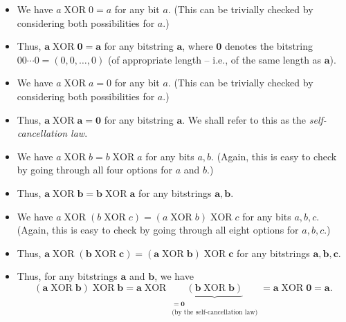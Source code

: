 \documentclass[numbers=enddot,12pt,final,onecolumn,notitlepage]{scrartcl}%
\numberwithin{exer}{subsection}
\theoremstyle{definition}
\begin{document}
\begin{itemize}
\item We have $a\operatorname*{XOR}0=a$ for any bit $a$. (This can be
trivially checked by considering both possibilities for $a$.)

\item Thus, $\mathbf{a}\operatorname*{XOR}\mathbf{0}=\mathbf{a}$ for any
bitstring $\mathbf{a}$, where $\mathbf{0}$ denotes the bitstring
$00\cdots0=\left(  0,0,\ldots,0\right)  $ (of appropriate length -- i.e., of
the same length as $\mathbf{a}$).

\item We have $a\operatorname*{XOR}a=0$ for any bit $a$. (This can be
trivially checked by considering both possibilities for $a$.)

\item Thus, $\mathbf{a}\operatorname*{XOR}\mathbf{a}=\mathbf{0}$ for any
bitstring $\mathbf{a}$. We shall refer to this as the
\textit{self-cancellation law}.

\item We have $a\operatorname*{XOR}b=b\operatorname*{XOR}a$ for any bits
$a,b$. (Again, this is easy to check by going through all four options for $a$
and $b$.)

\item Thus, $\mathbf{a}\operatorname*{XOR}\mathbf{b}=\mathbf{b}%
\operatorname*{XOR}\mathbf{a}$ for any bitstrings $\mathbf{a},\mathbf{b}$.

\item We have $a\operatorname*{XOR}\left(  b\operatorname*{XOR}c\right)
=\left(  a\operatorname*{XOR}b\right)  \operatorname*{XOR}c$ for any bits
$a,b,c$. (Again, this is easy to check by going through all eight options for
$a,b,c$.)

\item Thus, $\mathbf{a}\operatorname*{XOR}\left(  \mathbf{b}%
\operatorname*{XOR}\mathbf{c}\right)  =\left(  \mathbf{a}\operatorname*{XOR}%
\mathbf{b}\right)  \operatorname*{XOR}\mathbf{c}$ for any bitstrings
$\mathbf{a},\mathbf{b},\mathbf{c}$.

\item Thus, for any bitstrings $\mathbf{a}$ and $\mathbf{b}$, we have%
\[
\left(  \mathbf{a}\operatorname*{XOR}\mathbf{b}\right)  \operatorname*{XOR}%
\mathbf{b}=\mathbf{a}\operatorname*{XOR}\underbrace{\left(  \mathbf{b}%
\operatorname*{XOR}\mathbf{b}\right)  }_{\substack{=\mathbf{0}\\\text{(by the
self-cancellation law)}}}=\mathbf{a}\operatorname*{XOR}\mathbf{0}=\mathbf{a}.
\]



\end{itemize}
\end{document}
